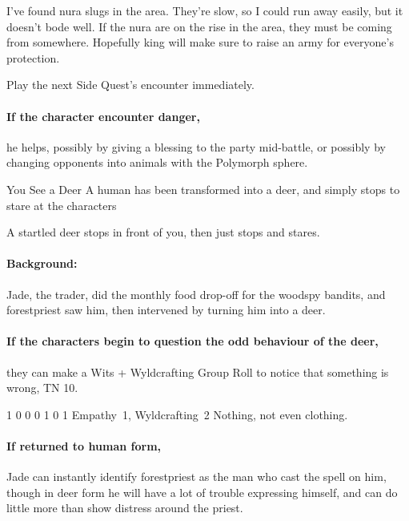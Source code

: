 \begin{multicols}{2}
\begin{speechtext}

  I've found nura slugs in the area.
  They're slow, so I could run away easily, but it doesn't bode well.
  If the nura are on the rise in the area, they must be coming from somewhere.
  Hopefully \gls{king} will make sure to raise an army for everyone's protection.

\end{speechtext}

Play the next Side Quest's encounter immediately.
\paragraph{If the character encounter danger,}
he helps, possibly by giving a blessing to the party mid-battle, or possibly by changing opponents into animals with the Polymorph sphere.

\forestpriest

{You See a Deer}%
{A human has been transformed into a deer, and simply stops to stare at the characters}%
\label{seeADeer}

\begin{boxtext}

  A startled deer stops in front of you, then just stops and stares.

\end{boxtext}

\paragraph{Background:}
Jade, the trader, did the monthly food drop-off for the woodspy bandits, and \gls{forestpriest} saw him, then intervened by turning him into a deer.

\paragraph{If the characters begin to question the odd behaviour of the deer,}
they can make a Wits + Wyldcrafting Group Roll to notice that something is wrong, TN 10.

  {1}%
  {0}%
  {{0}%
  {0}%
  {1}}%
  {0}%
  {1}%
  {Empathy~1, Wyldcrafting~2}%
  {Nothing, not even clothing.}%
  {}

\paragraph{If returned to human form,}
Jade can instantly identify \gls{forestpriest} as the man who cast the spell on him, though in deer form he will have a lot of trouble expressing himself, and can do little more than show distress around the priest.


\end{multicols}
